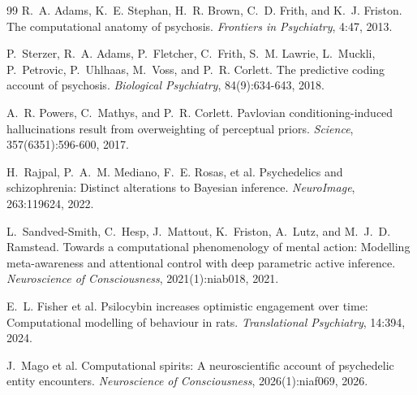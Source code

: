 \documentclass[11pt]{article}
\begin{document}
\begin{thebibliography}{99}
 R.~A. Adams, K.~E. Stephan, H.~R. Brown, C.~D. Frith, and
K.~J. Friston. The computational anatomy of psychosis. \emph{Frontiers in
Psychiatry}, 4:47, 2013.

 P.~Sterzer, R.~A. Adams, P.~Fletcher, C.~Frith, S.~M.
Lawrie, L.~Muckli, P.~Petrovic, P.~Uhlhaas, M.~Voss, and P.~R. Corlett. The
predictive coding account of psychosis. \emph{Biological Psychiatry},
84(9):634-643, 2018.

 A.~R. Powers, C.~Mathys, and P.~R. Corlett.
Pavlovian conditioning-induced hallucinations result from overweighting of
perceptual priors. \emph{Science}, 357(6351):596-600, 2017.

 H.~Rajpal, P.~A.~M. Mediano, F.~E. Rosas, et al.
Psychedelics and schizophrenia: Distinct alterations to Bayesian inference.
\emph{NeuroImage}, 263:119624, 2022.

 L.~Sandved-Smith, C.~Hesp, J.~Mattout, K.~Friston,
A.~Lutz, and M.~J.~D. Ramstead. Towards a computational phenomenology of mental
action: Modelling meta-awareness and attentional control with deep parametric
active inference. \emph{Neuroscience of Consciousness}, 2021(1):niab018, 2021.

 E.~L. Fisher et al. Psilocybin increases optimistic
engagement over time: Computational modelling of behaviour in rats.
\emph{Translational Psychiatry}, 14:394, 2024.

 J.~Mago et al. Computational spirits: A neuroscientific
account of psychedelic entity encounters. \emph{Neuroscience of Consciousness},
2026(1):niaf069, 2026.

\end{thebibliography}
\end{document}
